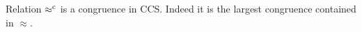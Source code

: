 \begin{theorem}
\label{t:rapproxCongruence}
Relation $\mathrel{\approx^{\rm{c}}}$ is a congruence in CCS.  Indeed it is the
largest congruence contained in $\approx$.
\end{theorem}  




